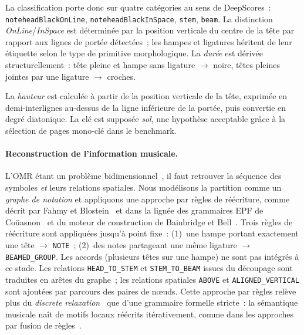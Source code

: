 \documentclass[a4paper,10pt]{article}
\begin{document}
La classification porte donc sur quatre catégories au sens de DeepScores~: \texttt{noteheadBlackOnLine}, \texttt{noteheadBlackInSpace}, \texttt{stem}, \texttt{beam}. La distinction \emph{OnLine}/\emph{InSpace} est déterminée par la position verticale du centre de la tête par rapport aux lignes de portée détectées~; les hampes et ligatures héritent de leur étiquette selon le type de primitive morphologique. La \emph{durée} est dérivée structurellement~: tête pleine et hampe sans ligature $\to$ noire, têtes pleines jointes par une ligature $\to$ croches.

La \emph{hauteur} est calculée à partir de la position verticale de la tête, exprimée en demi-interlignes au-dessus de la ligne inférieure de la portée, puis convertie en degré diatonique. La clé est supposée \emph{sol}, une hypothèse acceptable grâce à la sélection de pages mono-clé dans le benchmark.

\paragraph{Reconstruction de l'information musicale.}
L'OMR étant un problème bidimensionnel~\cite{shatri2020opticalmusicrecognitionstate}, il faut retrouver la séquence des symboles \emph{et} leurs relations spatiales. Nous modélisons la partition comme un \emph{graphe de notation} et appliquons une approche par règles de réécriture, comme décrit par Fahmy et Blostein~\cite{fahmy1993graphgrammar,fahmy1998graphrewriting,blostein1997lncs} et dans la lignée des grammaires EPF de Coüasnon~\cite{couasnon1995,couasnon2006dmos} et du moteur de construction de Bainbridge et Bell~\cite{bainbridge2003}. Trois règles de réécriture sont appliquées jusqu'à point fixe~: (1)~une hampe portant exactement une tête $\to$ \texttt{NOTE}~; (2)~des notes partageant une même ligature $\to$ \texttt{BEAMED\_GROUP}. Les accords (plusieurs têtes sur une hampe) ne sont pas intégrés à ce stade. Les relations \texttt{HEAD\_TO\_STEM} et \texttt{STEM\_TO\_BEAM} issues du découpage sont traduites en arêtes du graphe~; les relations spatiales \texttt{ABOVE} et \texttt{ALIGNED\_VERTICAL} sont ajoutées par parcours des paires de n{\oe}uds. Cette approche par règles relève plus du \emph{discrete relaxation}~\cite{fahmy1998graphrewriting} que d'une grammaire formelle stricte~: la sémantique musicale naît de motifs locaux réécrits itérativement, comme dans les approches par fusion de règles~\cite{rossant2007robust}.
\end{document}
